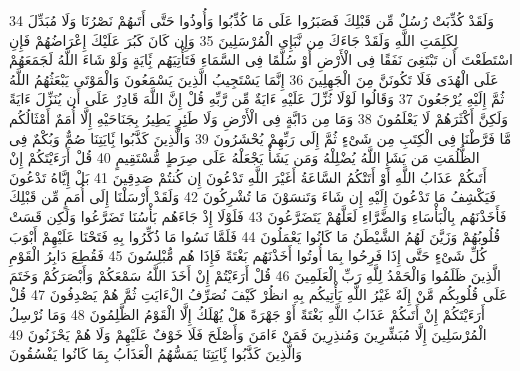 \documentclass[20pt,a4paper]{article}
\begin{document}
{\tiny\colorbox{cl_aya}{34}} وَلَقَدْ كُذِّبَتْ رُسُلٌ مِّن قَبْلِكَ فَصَبَرُوا عَلَى مَا كُذِّبُوا وَأُوذُوا حَتَّى أَتَىهُمْ نَصْرُنَا وَلَا مُبَدِّلَ لِكَلِمَتِ اللَّهِ وَلَقَدْ جَاءَكَ مِن نَّبَإِى الْمُرْسَلِينَ
{\tiny\colorbox{cl_aya}{35}} وَإِن كَانَ كَبُرَ عَلَيْكَ إِعْرَاضُهُمْ فَإِنِ اسْتَطَعْتَ أَن تَبْتَغِىَ نَفَقًا فِى الْأَرْضِ أَوْ سُلَّمًا فِى السَّمَاءِ فَتَأْتِيَهُم بَِٔايَةٍ وَلَوْ شَاءَ اللَّهُ لَجَمَعَهُمْ عَلَى الْهُدَى فَلَا تَكُونَنَّ مِنَ الْجَهِلِينَ
{\tiny\colorbox{cl_aya}{36}} إِنَّمَا يَسْتَجِيبُ الَّذِينَ يَسْمَعُونَ وَالْمَوْتَى يَبْعَثُهُمُ اللَّهُ ثُمَّ إِلَيْهِ يُرْجَعُونَ
{\tiny\colorbox{cl_aya}{37}} وَقَالُوا لَوْلَا نُزِّلَ عَلَيْهِ ءَايَةٌ مِّن رَّبِّهِ قُلْ إِنَّ اللَّهَ قَادِرٌ عَلَى أَن يُنَزِّلَ ءَايَةً وَلَكِنَّ أَكْثَرَهُمْ لَا يَعْلَمُونَ
{\tiny\colorbox{cl_aya}{38}} وَمَا مِن دَابَّةٍ فِى الْأَرْضِ وَلَا طَئِرٍ يَطِيرُ بِجَنَاحَيْهِ إِلَّا أُمَمٌ أَمْثَالُكُم مَّا فَرَّطْنَا فِى الْكِتَبِ مِن شَىْءٍ ثُمَّ إِلَى رَبِّهِمْ يُحْشَرُونَ
{\tiny\colorbox{cl_aya}{39}} وَالَّذِينَ كَذَّبُوا بَِٔايَتِنَا صُمٌّ وَبُكْمٌ فِى الظُّلُمَتِ مَن يَشَإِ اللَّهُ يُضْلِلْهُ وَمَن يَشَأْ يَجْعَلْهُ عَلَى صِرَطٍ مُّسْتَقِيمٍ
{\tiny\colorbox{cl_aya}{40}} قُلْ أَرَءَيْتَكُمْ إِنْ أَتَىكُمْ عَذَابُ اللَّهِ أَوْ أَتَتْكُمُ السَّاعَةُ أَغَيْرَ اللَّهِ تَدْعُونَ إِن كُنتُمْ صَدِقِينَ
{\tiny\colorbox{cl_aya}{41}} بَلْ إِيَّاهُ تَدْعُونَ فَيَكْشِفُ مَا تَدْعُونَ إِلَيْهِ إِن شَاءَ وَتَنسَوْنَ مَا تُشْرِكُونَ
{\tiny\colorbox{cl_aya}{42}} وَلَقَدْ أَرْسَلْنَا إِلَى أُمَمٍ مِّن قَبْلِكَ فَأَخَذْنَهُم بِالْبَأْسَاءِ وَالضَّرَّاءِ لَعَلَّهُمْ يَتَضَرَّعُونَ
{\tiny\colorbox{cl_aya}{43}} فَلَوْلَا إِذْ جَاءَهُم بَأْسُنَا تَضَرَّعُوا وَلَكِن قَسَتْ قُلُوبُهُمْ وَزَيَّنَ لَهُمُ الشَّيْطَنُ مَا كَانُوا يَعْمَلُونَ
{\tiny\colorbox{cl_aya}{44}} فَلَمَّا نَسُوا مَا ذُكِّرُوا بِهِ فَتَحْنَا عَلَيْهِمْ أَبْوَبَ كُلِّ شَىْءٍ حَتَّى إِذَا فَرِحُوا بِمَا أُوتُوا أَخَذْنَهُم بَغْتَةً فَإِذَا هُم مُّبْلِسُونَ
{\tiny\colorbox{cl_aya}{45}} فَقُطِعَ دَابِرُ الْقَوْمِ الَّذِينَ ظَلَمُوا وَالْحَمْدُ لِلَّهِ رَبِّ الْعَلَمِينَ
{\tiny\colorbox{cl_aya}{46}} قُلْ أَرَءَيْتُمْ إِنْ أَخَذَ اللَّهُ سَمْعَكُمْ وَأَبْصَرَكُمْ وَخَتَمَ عَلَى قُلُوبِكُم مَّنْ إِلَهٌ غَيْرُ اللَّهِ يَأْتِيكُم بِهِ انظُرْ كَيْفَ نُصَرِّفُ الْءَايَتِ ثُمَّ هُمْ يَصْدِفُونَ
{\tiny\colorbox{cl_aya}{47}} قُلْ أَرَءَيْتَكُمْ إِنْ أَتَىكُمْ عَذَابُ اللَّهِ بَغْتَةً أَوْ جَهْرَةً هَلْ يُهْلَكُ إِلَّا الْقَوْمُ الظَّلِمُونَ
{\tiny\colorbox{cl_aya}{48}} وَمَا نُرْسِلُ الْمُرْسَلِينَ إِلَّا مُبَشِّرِينَ وَمُنذِرِينَ فَمَنْ ءَامَنَ وَأَصْلَحَ فَلَا خَوْفٌ عَلَيْهِمْ وَلَا هُمْ يَحْزَنُونَ
{\tiny\colorbox{cl_aya}{49}} وَالَّذِينَ كَذَّبُوا بَِٔايَتِنَا يَمَسُّهُمُ الْعَذَابُ بِمَا كَانُوا يَفْسُقُونَ
\end{document}
